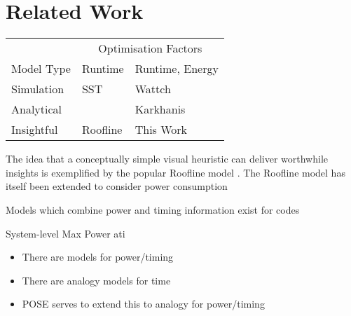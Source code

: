 \section{Related Work}
\label{sec:related}

\begin{table}
\centering
\footnotesize
\setlength{\tabcolsep}{10pt}
\begin{tabular}{lll}
\toprule
  & \multicolumn{2}{c}{Optimisation Factors}\\ \cmidrule(r){2-3}
Model Type  & Runtime & Runtime, Energy \\
  \midrule
Simulation  & SST~\cite{rodrigues:2011aa} & Wattch~\cite{brooks:2000aa}  \\
Analytical  & \citep{williams:2009aa} & Karkhanis \\
Insightful  & Roofline & This Work \\
\bottomrule
\end{tabular}
\end{table}


The idea that a conceptually simple visual heuristic can deliver worthwhile insights is exemplified by the popular Roofline model \cite{williams:2009aa}. The Roofline model has itself been extended to consider power consumption \cite{choi:2013aa} 



Models which combine power and timing information exist for codes 

System-level Max Power ati




\begin{itemize}
  \item There are models for power/timing
  \item There are analogy models for time
  \item POSE serves to extend this to analogy for power/timing
\end{itemize}

